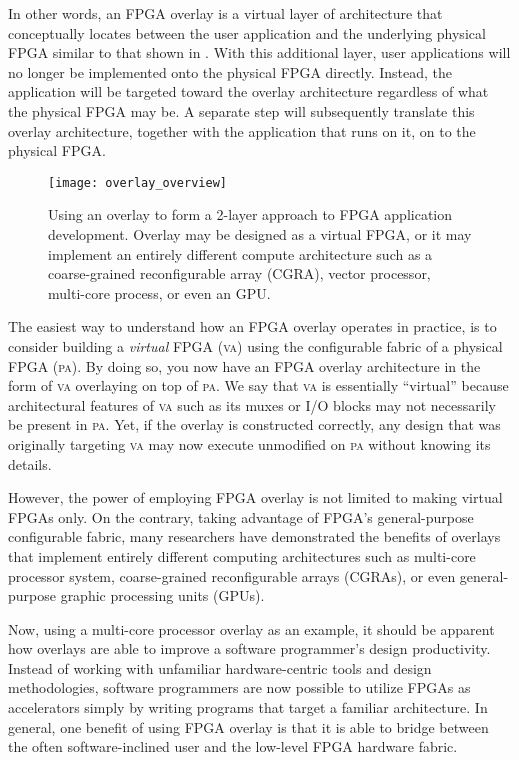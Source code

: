 In other words, an FPGA overlay is a virtual layer of architecture that conceptually locates between the user application and the underlying physical FPGA similar to that shown in .
With this additional layer, user applications will no longer be implemented onto the physical FPGA directly.
Instead, the application will be targeted toward the overlay architecture regardless of what the physical FPGA may be.
A separate step will subsequently translate this overlay architecture, together with the application that runs on it, on to the physical FPGA.

\begin{figure}
\centering
\texttt{[image: overlay\_overview]}
\caption{Using an overlay to form a 2-layer approach to FPGA application development.  Overlay may be designed as a virtual FPGA, or it may implement an entirely different compute architecture such as a coarse-grained reconfigurable array (CGRA), vector processor, multi-core process, or even an GPU.}
\label{fig:overlay_overview}
\end{figure}

The easiest way to understand how an FPGA overlay operates in practice, is to consider building a \emph{virtual} FPGA (\textsc{va}) using the configurable fabric of a physical FPGA (\textsc{pa}).  By doing so, you now have an FPGA overlay architecture in the form of \textsc{va} overlaying on top of \textsc{pa}.  We say that \textsc{va} is essentially ``virtual'' because architectural features of \textsc{va} such as its muxes or I/O blocks may not necessarily be present in \textsc{pa}.  Yet, if the overlay is constructed correctly, any design that was originally targeting \textsc{va} may now execute unmodified on \textsc{pa} without knowing its details.

However, the power of employing FPGA overlay is not limited to making virtual FPGAs only.
On the contrary, taking advantage of FPGA's general-purpose configurable fabric, many researchers have demonstrated the benefits of overlays that implement entirely different computing architectures such as 
multi-core processor system, coarse-grained reconfigurable arrays (CGRAs), or even general-purpose graphic processing units (GPUs).

Now, using a multi-core processor overlay as an example, it should be apparent how overlays are able to improve a software programmer's design productivity.
Instead of working with unfamiliar hardware-centric tools and design methodologies, software programmers are now possible to utilize FPGAs as accelerators simply by writing programs that target a familiar architecture.
In general, one benefit of using FPGA overlay is that it is able to bridge between the often software-inclined user and the low-level FPGA hardware fabric.

